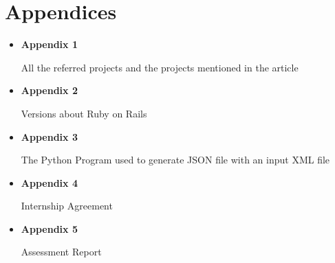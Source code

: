 \section{Appendices}
\begin{itemize}

\item{\textbf{Appendix 1}}

All the referred projects and the projects mentioned in the article

\item{\textbf{Appendix 2}}

Versions about Ruby on Rails

\item{\textbf{Appendix 3}}

The Python Program used to generate JSON file with an input XML file

\item{\textbf{Appendix 4}}

Internship Agreement

\item{\textbf{Appendix 5}}

Assessment Report

\end{itemize}
\newpage
